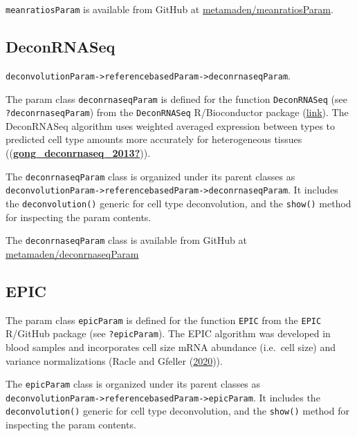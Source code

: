 \documentclass[]{article}
\begin{document}
\texttt{meanratiosParam} is available from GitHub at \href{https://github.com/metamaden/meanratiosParam}{metamaden/meanratiosParam}.

\hypertarget{deconrnaseq}{%
\subsection{DeconRNASeq}\label{deconrnaseq}}

\texttt{deconvolutionParam-\textgreater{}referencebasedParam-\textgreater{}deconrnaseqParam}.

The param class \texttt{deconrnaseqParam} is defined for the function \texttt{DeconRNASeq}
(see \texttt{?deconrnaseqParam}) from the \texttt{DeconRNASeq} R/Bioconductor package
(\href{https://bioconductor.org/packages/release/bioc/html/DeconRNASeq.html}{link}).
The DeconRNASeq algorithm uses weighted averaged expression between types to
predicted cell type amounts more accurately for heterogeneous tissues
((\protect\hyperlink{ref-gong_deconrnaseq_2013}{\textbf{gong\_deconrnaseq\_2013?}})).

The \texttt{deconrnaseqParam} class is organized under its parent classes as
\texttt{deconvolutionParam-\textgreater{}referencebasedParam-\textgreater{}deconrnaseqParam}. It includes the
\texttt{deconvolution()} generic for cell type deconvolution, and the \texttt{show()} method
for inspecting the param contents.

The \texttt{deconrnaseqParam} class is available from GitHub at
\href{https://github.com/metamaden/deconrnaseqParam}{metamaden/deconrnaseqParam}

\hypertarget{epic}{%
\subsection{EPIC}\label{epic}}

The param class \texttt{epicParam} is defined for the function \texttt{EPIC} from the \texttt{EPIC}
R/GitHub package (see \texttt{?epicParam}). The EPIC algorithm was developed in blood
samples and incorporates cell size mRNA abundance (i.e.~cell size) and variance
normalizations (Racle and Gfeller (\protect\hyperlink{ref-racle_epic_2020}{2020})).

The \texttt{epicParam} class is organized under its parent classes as
\texttt{deconvolutionParam-\textgreater{}referencebasedParam-\textgreater{}epicParam}. It includes the
\texttt{deconvolution()} generic for cell type deconvolution, and the \texttt{show()} method for inspecting the param contents.
\end{document}
